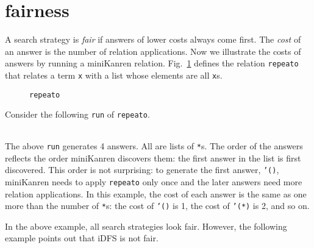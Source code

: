 \documentclass[format=acmlarge, review=true, authordraft=true]{acmart}
\begin{document}
\section{fairness}

A search strategy is \emph{fair} if answers of lower costs always come first. 
The \emph{cost} of an answer is the number of relation applications. Now we 
illustrate the costs of answers by running a miniKanren relation. 
Fig.~\ref{def-repeato} defines the relation \texttt{repeato} that relates a term 
\texttt{x} with a list whose elements are all \texttt{x}s.


\begin{figure}
  
  \caption{\texttt{repeato}}
  \label{def-repeato}
\end{figure}

Consider the following \texttt{run} of \texttt{repeato}.
\begin{center}
  \begin{tabular}{c}
  
   \end{tabular}
\end{center}

The above \texttt{run} generates 4 answers. All are lists of \texttt{*}s.
The order of the answers reflects the order miniKanren discovers them:
the first answer in the list is first discovered. This order is not surprising:
to generate the first answer, \texttt{'()}, miniKanren needs to apply
\texttt{repeato} only once and the later answers need more relation
applications. In this example, the cost of each answer is the same as
one more than the number of \texttt{*}s: the cost of \texttt{'()} is 1,
the cost of \texttt{'(*)} is 2, and so on.


In the above example, all search strategies look fair. However, the following 
example points out that iDFS is not fair.
\end{document}
